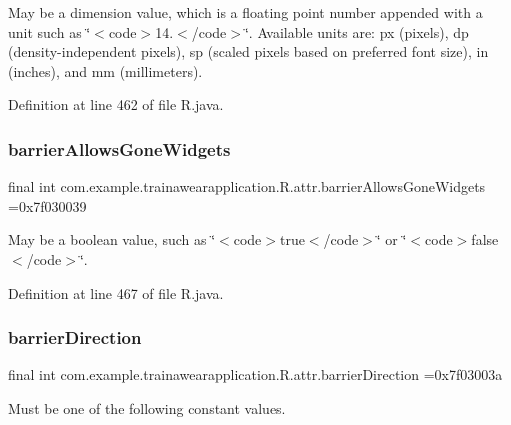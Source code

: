 May be a dimension value, which is a floating point number appended with a unit such as \char`\"{}$<$code$>$14.\+5sp$<$/code$>$\char`\"{}. Available units are\+: px (pixels), dp (density-\/independent pixels), sp (scaled pixels based on preferred font size), in (inches), and mm (millimeters). 

Definition at line 462 of file R.\+java.

\mbox{\label{classcom_1_1example_1_1trainawearapplication_1_1_r_1_1attr_ae34e7c2497c02484571374930679ff8e}} 
\subsubsection{\texorpdfstring{barrierAllowsGoneWidgets}{barrierAllowsGoneWidgets}}
{\footnotesize\ttfamily final int com.\+example.\+trainawearapplication.\+R.\+attr.\+barrier\+Allows\+Gone\+Widgets =0x7f030039\hspace{0.3cm}{\ttfamily [static]}}

May be a boolean value, such as \char`\"{}$<$code$>$true$<$/code$>$\char`\"{} or \char`\"{}$<$code$>$false$<$/code$>$\char`\"{}. 

Definition at line 467 of file R.\+java.

\mbox{\label{classcom_1_1example_1_1trainawearapplication_1_1_r_1_1attr_ad008a1714b35b56003c259965cbfb6a7}} 
\subsubsection{\texorpdfstring{barrierDirection}{barrierDirection}}
{\footnotesize\ttfamily final int com.\+example.\+trainawearapplication.\+R.\+attr.\+barrier\+Direction =0x7f03003a\hspace{0.3cm}{\ttfamily [static]}}

Must be one of the following constant values.

